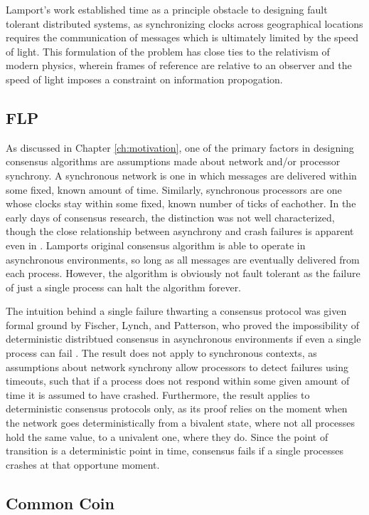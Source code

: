 Lamport's work established time as a principle obstacle to designing fault tolerant distributed systems,
as synchronizing clocks across geographical locations requires the communication of messages 
which is ultimately limited by the speed of light.
This formulation of the problem has close ties to the relativism of modern physics,
wherein frames of reference are relative to an observer and the speed of light imposes a constraint on information propogation.

\subsection{FLP}
As discussed in Chapter \ref{ch:motivation}, 
one of the primary factors in designing consensus algorithms are assumptions made about 
network and/or processor synchrony. 
A synchronous network is one in which messages are delivered within some fixed, 
known amount of time. 
Similarly, synchronous processors are one whose clocks stay within some fixed, 
known number of ticks of eachother.
In the early days of consensus research, the distinction was not well characterized, 
though the close relationship between asynchrony and crash failures is apparent even in \cite{clocks}.
Lamports original consensus algorithm is able to operate in asynchronous environments, 
so long as all messages are eventually delivered from each process.
However, the algorithm is obviously not fault tolerant as the failure of just a single process can halt the algorithm forever.

The intuition behind a single failure thwarting a consensus protocol was given formal ground by Fischer, Lynch, and Patterson,
who proved the impossibility of deterministic distribtued consensus in asynchronous environments if even a single process can fail \cite{flp}.
The result does not apply to synchronous contexts, 
as assumptions about network synchrony allow processors to detect failures using timeouts, 
such that if a process does not respond within some given amount of time it is assumed to have crashed.
Furthermore, the result applies to deterministic consensus protocols only, 
as its proof relies on the moment when the network goes deterministically from a bivalent state, 
where not all processes hold the same value, to a univalent one, where they do.
Since the point of transition is a deterministic point in time, 
consensus fails if a single processes crashes at that opportune moment.

\subsection{Common Coin}


